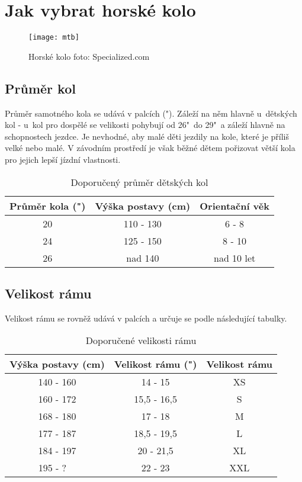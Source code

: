 \documentclass[11pt]{article}
\begin{document}
\section[Výběr kola]{Jak vybrat horské kolo}
\begin{figure}[h]
    \centering
    \texttt{[image: mtb]}
    \caption{Horské kolo  \tiny{foto: Specialized.com}}
    \label{fig:mtb}
\end{figure}
\subsection{Průměr kol}
Průměr samotného kola se udává v palcích ("). Záleží na něm hlavně u~dětských kol - u~kol pro dospělé se velikosti pohybují od 26"~do 29"~a záleží hlavně na schopnostech jezdce. 
\newline Je nevhodné, aby malé děti jezdily na kole, které je příliš velké nebo malé. V závodním prostředí je však běžné dětem pořizovat větší kola pro jejich lepší jízdní vlastnosti. 
\begin{table}[h]
\caption{\label{tab:detskakola}Doporučený průměr dětských kol \cite{velikostiKol}}
    \centering
    \begin{tabular}{|c | c | c |} 
        \hline
        Průměr kola (")& Výška postavy (cm) & Orientační věk \\ 
        \hline\hline
        20 & 110 - 130 & 6 - 8 \\ 
        \hline
        24 & 125 - 150 & 8 - 10 \\
        \hline
        26 & nad 140 & nad 10 let \\
        \hline
    \end{tabular}

\end{table}
\subsection{Velikost rámu}
Velikost rámu se rovněž udává v palcích a určuje se podle následující tabulky.
\begin{table}[h]
\caption{\label{tab:velikostRamu}Doporučené velikosti rámu \cite{velikostiKol}}
    \centering
    \begin{tabular}{|c | c | c |} 
        \hline
        Výška postavy (cm) & Velikost rámu (") & Velikost rámu \\ 
        \hline\hline
        140 - 160 & 14 - 15 & XS \\ 
        \hline
        160 - 172 & 15,5 - 16,5 & S \\
        \hline
        168 - 180 & 17 - 18 & M \\
        \hline
        177 - 187 & 18,5 - 19,5 & L \\
        \hline
        184 - 197 & 20 - 21,5 & XL \\
        \hline
        195 - ?~~ & 22 - 23 & XXL \\
        \hline
    \end{tabular}

\end{table}
\end{document}
